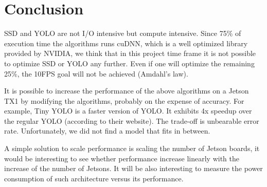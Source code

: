 \section{Conclusion}
\label{sec:conclusion}

SSD and YOLO are not I/O intensive but compute intensive. Since 75\% of execution time the algorithms runs cuDNN, which is a well optimized library provided by NVIDIA, we think that in this project time frame it is not possible to optimize SSD or YOLO any further. Even if one will optimize the remaining 25\%, the 10FPS goal will not be achieved (Amdahl's law).

It is possible to increase the performance of the above algorithms on a Jetson TX1 by modifying the algorithms, probably on the expense of accuracy. For example, Tiny YOLO is a faster version of YOLO. It exhibits 4x speedup over the regular YOLO (according to their website). The trade-off is unbearable error rate. Unfortunately, we did not find a model that fits in between.

A simple solution to scale performance is scaling the number of Jetson boards, it would be interesting to see whether performance increase linearly with the increase of the number of Jetsons. It will be also interesting to measure the power consumption of such architecture versus its performance.
